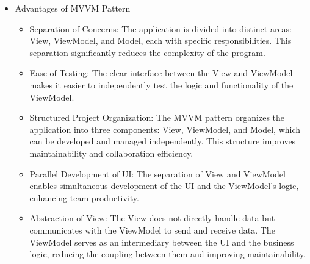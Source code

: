 \documentclass[conference]{IEEEtran}
\begin{document}
\begin{itemize}
    \item Advantages of MVVM Pattern
\begin{itemize}
    \item Separation of Concerns: The application is divided into distinct areas: View, ViewModel, and Model, each with specific responsibilities. This separation significantly reduces the complexity of the program.\\
    \item Ease of Testing: The clear interface between the View and ViewModel makes it easier to independently test the logic and functionality of the ViewModel.\\
    \item Structured Project Organization: The MVVM pattern organizes the application into three components: View, ViewModel, and Model, which can be developed and managed independently. This structure improves maintainability and collaboration efficiency.\\
    \item Parallel Development of UI: The separation of View and ViewModel enables simultaneous development of the UI and the ViewModel’s logic, enhancing team productivity.\\
    \item Abstraction of View: The View does not directly handle data but communicates with the ViewModel to send and receive data. The ViewModel serves as an intermediary between the UI and the business logic, reducing the coupling between them and improving maintainability.\\  
\end{itemize}
\end{itemize}
\end{document}
